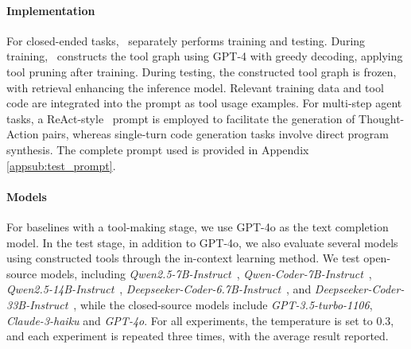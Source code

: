 \paragraph{Implementation}
For closed-ended tasks, \ours\ separately performs training and testing. During training, \ours\ constructs the tool graph using GPT-4 with greedy decoding, applying tool pruning after training. During testing, the constructed tool graph is frozen, with retrieval enhancing the inference model. Relevant training data and tool code are integrated into the prompt as tool usage examples. For multi-step agent tasks, a ReAct-style~\citep{yao2022react} prompt is employed to facilitate the generation of Thought-Action pairs, whereas single-turn code generation tasks involve direct program synthesis. The complete prompt used is provided in Appendix \ref{appsub:test_prompt}.
\vspace{-5pt}
\paragraph{Models}
For baselines with a tool-making stage, we use GPT-4o as the text completion model. In the test stage, in addition to GPT-4o, we also evaluate several models using constructed tools through the in-context learning method. We test open-source models, including \textit{Qwen2.5-7B-Instruct}~\citep{yang2024qwen2}, \textit{Qwen-Coder-7B-Instruct}~\citep{hui2024qwen2}, \textit{Qwen2.5-14B-Instruct}~\citep{yang2024qwen2}, \textit{Deepseeker-Coder-6.7B-Instruct}~\citep{guo2024deepseek}, and \textit{Deepseeker-Coder-33B-Instruct}~\citep{guo2024deepseek}, while the closed-source models include \textit{GPT-3.5-turbo-1106}, \textit{Claude-3-haiku} and \textit{GPT-4o}. For all experiments, the temperature is set to 0.3, and each experiment is repeated three times, with the average result reported.
